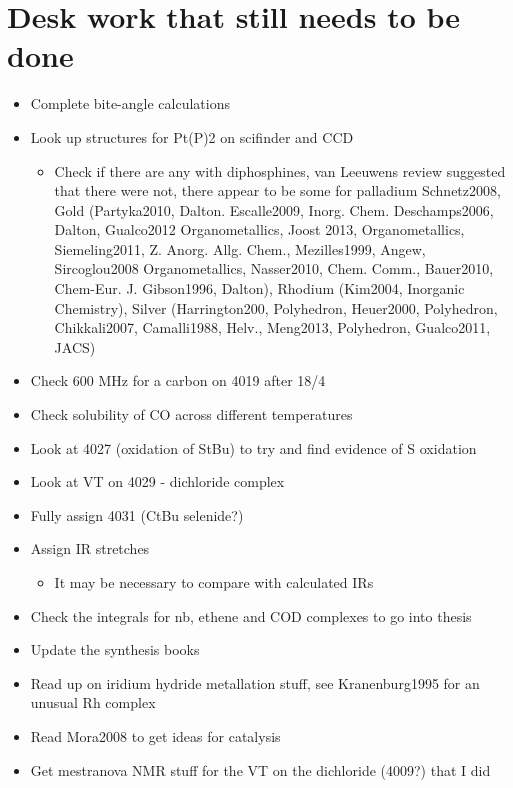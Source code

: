 \section{Desk work that still needs to be done}
\begin{itemize}
\item{Complete bite-angle calculations}
\item{Look up structures for Pt(P)2 on scifinder and CCD}
	\begin{itemize}
	\item{Check if there are any with diphosphines, van Leeuwens review suggested that there were not, there appear to be some for palladium Schnetz2008, Gold (Partyka2010, Dalton. Escalle2009, Inorg. Chem. Deschamps2006, Dalton, Gualco2012 Organometallics, Joost 2013, Organometallics, Siemeling2011, Z. Anorg. Allg. Chem., Mezilles1999, Angew, Sircoglou2008 Organometallics, Nasser2010, Chem. Comm., Bauer2010, Chem-Eur. J. Gibson1996, Dalton), Rhodium (Kim2004, Inorganic Chemistry), Silver (Harrington200, Polyhedron, Heuer2000, Polyhedron, Chikkali2007, Camalli1988, Helv., Meng2013, Polyhedron, Gualco2011, JACS)}
	\end{itemize}
\item{Check 600 MHz for a carbon on 4019 after 18/4}
\item{Check solubility of CO across different temperatures}
\item{Look at 4027 (oxidation of StBu) to try and find evidence of S oxidation}
\item{Look at VT on 4029 - dichloride complex}
\item{Fully assign 4031 (CtBu selenide?)}
\item{Assign IR stretches}
	\begin{itemize}
	\item{It may be necessary to compare with calculated IRs}
	\end{itemize}
\item{Check the integrals for nb, ethene and COD complexes to go into thesis}
\item{Update the synthesis books}
\item{Read up on iridium hydride metallation stuff, see Kranenburg1995 for an unusual Rh complex}
\item{Read Mora2008 to get ideas for catalysis}
\item{Get mestranova NMR stuff for the VT on the dichloride (4009?) that I did}
\end{itemize}

